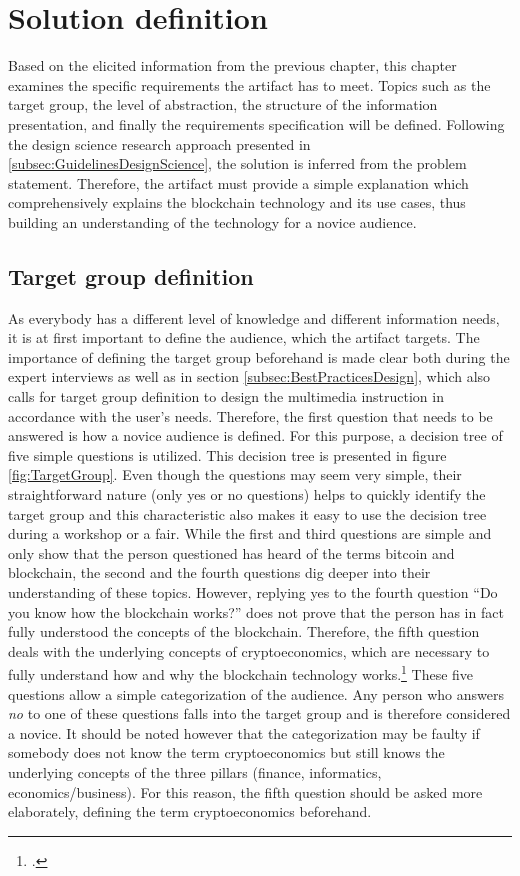 \chapter{Solution definition} \label{chapter:Solution}

Based on the elicited information from the previous chapter, this chapter examines the specific requirements the artifact has to meet. Topics such as the target group, the level of abstraction, the structure of the information presentation, and finally the requirements specification will be defined. Following the design science research approach presented in \ref{subsec:GuidelinesDesignScience}, the solution is inferred from the problem statement. Therefore, the artifact must provide a simple explanation which comprehensively explains the blockchain technology and its use cases, thus building an understanding of the technology for a novice audience. 

\section{Target group definition}
As everybody has a different level of knowledge and different information needs, it is at first important to define the audience, which the artifact targets. The importance of defining the target group beforehand is made clear both during the expert interviews as well as in section \ref{subsec:BestPracticesDesign}, which also calls for target group definition to design the multimedia instruction in accordance with the user's needs. Therefore, the first question that needs to be answered is how a novice audience is defined. For this purpose, a decision tree of five simple questions is utilized. This decision tree is presented in figure \ref{fig:TargetGroup}. Even though the questions may seem very simple, their straightforward nature (only yes or no questions) helps to quickly identify the target group and this characteristic also makes it easy to use the decision tree during a workshop or a fair. While the first and third questions are simple and only show that the person questioned has heard of the terms bitcoin and blockchain, the second and the fourth questions dig deeper into their understanding of these topics. However, replying yes to the fourth question \enquote{Do you know how the blockchain works?} does not prove that the person has in fact fully understood the concepts of the blockchain. Therefore, the fifth question deals with the underlying concepts of cryptoeconomics, which are necessary to fully understand how and why the blockchain technology works.\footcite[Cf.][]{RalphBeckmann_Interview} These five questions allow a simple categorization of the audience. Any person who answers \textit{no} to one of these questions falls into the target group and is therefore considered a novice. It should be noted however that the categorization may be faulty if somebody does not know the term cryptoeconomics but still knows the underlying concepts of the three pillars (finance, informatics, economics/business). For this reason, the fifth question should be asked more elaborately, defining the term cryptoeconomics beforehand.

